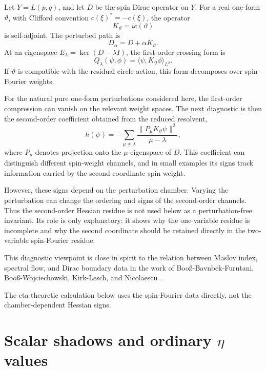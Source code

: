 \documentclass{article}
\theoremstyle{definition}
\numberwithin{equation}{section}
\begin{document}
Let $Y=L(p,q)$, and let $D$ be the spin Dirac operator on $Y$.  For a real one-form $\vartheta$, with Clifford convention $c(\xi)^*=-c(\xi)$, the operator
\begin{equation}
K_\vartheta=i c(\vartheta)
\end{equation}
is self-adjoint.  The perturbed path is
\begin{equation}
D_\alpha=D+\alpha K_\vartheta.
\end{equation}
At an eigenspace $E_\lambda=\ker(D-\lambda I)$, the first-order crossing form is
\begin{equation}
Q_\lambda(\psi,\phi)=\langle \psi,K_\vartheta\phi\rangle_{L^2}.
\end{equation}
If $\vartheta$ is compatible with the residual circle action, this form decomposes over spin-Fourier weights.

For the natural pure one-form perturbations considered here, the first-order compression can vanish on the relevant weight spaces.  The next diagnostic is then the second-order coefficient obtained from the reduced resolvent,
\begin{equation}
h(\psi)
=
-\sum_{\mu\neq\lambda}
\frac{\|P_\mu K_\vartheta\psi\|^2}{\mu-\lambda},
\end{equation}
where $P_\mu$ denotes projection onto the $\mu$-eigenspace of $D$.  This coefficient can distinguish different spin-weight channels, and in small examples its signs track information carried by the second coordinate spin weight.

However, these signs depend on the perturbation chamber.  Varying the perturbation can change the ordering and signs of the second-order channels.  Thus the second-order Hessian residue is not used below as a perturbation-free invariant.  Its role is only explanatory: it shows why the one-variable residue is incomplete and why the second coordinate should be retained directly in the two-variable spin-Fourier residue.

This diagnostic viewpoint is close in spirit to the relation between Maslov index, spectral flow, and Dirac boundary data in the work of Boo\ss-Bavnbek-Furutani, Boo\ss-Wojciechowski, Kirk-Lesch, and Nicolaescu~\cite{BoossFurutani,BoossWojciechowski,KirkLesch,NicolaescuMaslov}.

The eta-theoretic calculation below uses the spin-Fourier data directly, not the chamber-dependent Hessian signs.

\FloatBarrier

\section{Scalar shadows and ordinary $\eta$ values}
\label{sec:stage5-scalar-eta-square}
\end{document}
